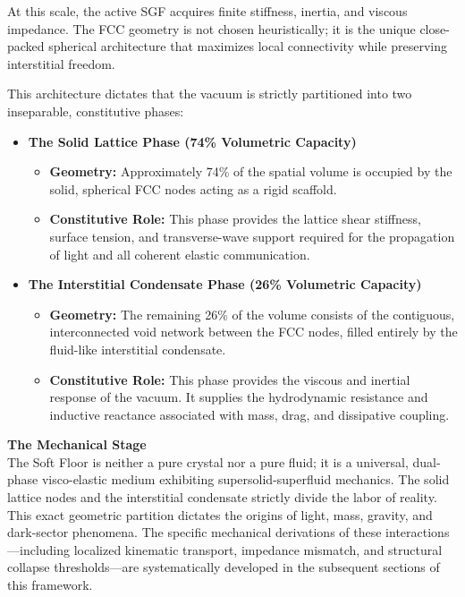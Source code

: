 At this scale, the active SGF acquires finite stiffness, inertia, and viscous impedance. The FCC geometry is not chosen heuristically; it is the unique close-packed spherical architecture that maximizes local connectivity while preserving interstitial freedom.

This architecture dictates that the vacuum is strictly partitioned into two inseparable, constitutive phases:
\begin{itemize}
    \item \textbf{The Solid Lattice Phase (74\% Volumetric Capacity)}
    \begin{itemize}
        \item \textbf{Geometry:} Approximately 74\% of the spatial volume is occupied by the solid, spherical FCC nodes acting as a rigid scaffold.
        \item \textbf{Constitutive Role:} This phase provides the lattice shear stiffness, surface tension, and transverse-wave support required for the propagation of light and all coherent elastic communication.
    \end{itemize}
    \item \textbf{The Interstitial Condensate Phase (26\% Volumetric Capacity)}
    \begin{itemize}
        \item \textbf{Geometry:} The remaining 26\% of the volume consists of the contiguous, interconnected void network between the FCC nodes, filled entirely by the fluid-like interstitial condensate.
        \item \textbf{Constitutive Role:} This phase provides the viscous and inertial response of the vacuum. It supplies the hydrodynamic resistance and inductive reactance associated with mass, drag, and dissipative coupling.
    \end{itemize}
\end{itemize}

\textbf{The Mechanical Stage}\\
The Soft Floor is neither a pure crystal nor a pure fluid; it is a universal, dual-phase visco-elastic medium exhibiting supersolid-superfluid mechanics. The solid lattice nodes and the interstitial condensate strictly divide the labor of reality. This exact geometric partition dictates the origins of light, mass, gravity, and dark-sector phenomena. The specific mechanical derivations of these interactions---including localized kinematic transport, impedance mismatch, and structural collapse thresholds---are systematically developed in the subsequent sections of this framework.

